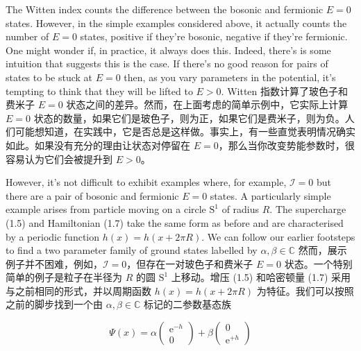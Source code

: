 \documentclass{article}
\newcommand{\rme}{\mathrm{e}}
\begin{document}
\begin{paracol}{2}
The Witten index counts the difference between the bosonic and fermionic $E = 0$ states. However, in the simple examples considered above, it actually counts the number of $E = 0$ states, positive if they're bosonic, negative if they're fermionic. One might wonder if, in practice, it always does this. Indeed, there's is some intuition that suggests this is the case. If there's no good reason for pairs of states to be stuck at $E = 0$ then, as you vary parameters in the potential, it's tempting to think that they will be lifted to $E > 0$.
\switchcolumn
Witten 指数计算了玻色子和费米子 $E = 0$ 状态之间的差异。然而，在上面考虑的简单示例中，它实际上计算 $E = 0$ 状态的数量，如果它们是玻色子，则为正，如果它们是费米子，则为负。人们可能想知道，在实践中，它是否总是这样做。事实上，有一些直觉表明情况确实如此。如果没有充分的理由让状态对停留在 $E = 0$，那么当你改变势能参数时，很容易认为它们会被提升到 $E > 0$。
\switchcolumn*

However, it's not diﬃcult to exhibit examples where, for example, $\mathcal{I} = 0$ but there are a pair of bosonic and fermionic $E = 0$ states. A particularly simple example arises from particle moving on a circle $\mathrm{S}^1$ of radius $R$. The supercharge (1.5) and Hamiltonian (1.7) take the same form as before and are characterised by a periodic function $h(x) = h(x + 2 \pi R)$. We can follow our earlier footsteps to find a two parameter family of ground states labelled by $\alpha, \beta \in \mathbb{C}$
\switchcolumn
然而，展示例子并不困难，例如，$\mathcal{I} = 0$，但存在一对玻色子和费米子 $E = 0$ 状态。一个特别简单的例子是粒子在半径为 $R$ 的圆 $\mathrm{S}^1$ 上移动。增压 (1.5) 和哈密顿量 (1.7) 采用与之前相同的形式，并以周期函数 $h(x) = h(x + 2 \pi R)$ 为特征。我们可以按照之前的脚步找到一个由 $\alpha, \beta \in \mathbb{C}$ 标记的二参数基态族
\end{paracol}

\[ \Psi(x) = \alpha \begin{pmatrix}
        \rme^{- h} \\ 0
    \end{pmatrix} + \beta \begin{pmatrix}
        0 \\ \rme^{+ h}
    \end{pmatrix} \]
\end{document}
